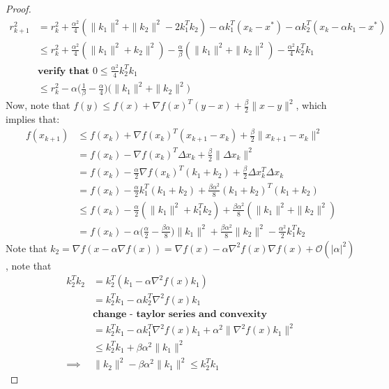 \begin{proof}
\begin{equation}
\begin{aligned}
r_{k+1}^2 &= r_k^2 + \frac{\alpha^2}{4}(\|k_1\|^2 + \|k_2\|^2 - 2k_1^T k_2) - \alpha k_1^T (x_k - x^*) - \alpha k_2^T (x_k - \alpha k_1 - x^*) \\
&\leq r_k^2 + \frac{\alpha^2}{4}(\| k_1\|^2 + k_2 \|^2) - \frac{\alpha}{\beta}(\|k_1\|^2 + \|k_2\|^2) - \frac{\alpha^2}{4}k_2^T k_1 \\
&\textbf{verify that } 0 \leq \frac{\alpha^2}{4}k_2^T k_1  \\
&\leq r_k^2 - \alpha \big(\frac{1}{\beta} - \frac{\alpha}{4}\big) \big( \|k_1\|^2 + \|k_2\|^2 \big)
\end{aligned}
\end{equation}
Now, note that $f(y) \leq f(x) + \nabla f(x)^T(y-x) + \frac{\beta}{2}\|x-y\|^2$, which implies that:
\begin{equation}
\begin{aligned}
f(x_{k+1}) &\leq f(x_k) + \nabla f(x_k)^T (x_{k+1} - x_k) + \frac{\beta}{2}\|x_{k+1} - x_k \|^2 \\
&= f(x_k) - \nabla f(x_k)^T \Delta x_k + \frac{\beta}{2}\| \Delta x_k \|^2 \\
&= f(x_k) - \frac{\alpha}{2}\nabla f(x_k)^T (k_1 + k_2) + \frac{\beta}{2}\Delta x_k^T \Delta x_k \\
&= f(x_k) - \frac{\alpha}{2}k_1^T(k_1 + k_2) + \frac{\beta \alpha^2}{8}(k_1 + k_2)^T(k_1 + k_2) \\
& \leq  f(x_k) - \frac{\alpha}{2}(\|k_1\|^2 + k_1^T k_2) + \frac{\beta \alpha^2}{8}(\|k_1\|^2 + \|k_2\|^2) \\
&= f(x_k) - \alpha \big(\frac{\alpha}{2} - \frac{\beta \alpha}{8}\big)\|k_1\|^2 + \frac{\beta \alpha^2}{8}\|k_2\|^2 - \frac{\alpha^2}{2} k_1^T k_2
\end{aligned}
\end{equation}
Note that $k_2 = \nabla f(x - \alpha \nabla f(x)) = \nabla f(x) - \alpha \nabla^2 f(x) \nabla f(x) + \mathcal{O}(|\alpha|^2)$, note that
\begin{equation}
\begin{aligned}
k_2^T k_2 &= k_2^T(k_1 - \alpha \nabla^2 f(x) k_1) \\
&= k_2^T k_1 - \alpha k_2^T \nabla^2 f(x) k_1 \\
& \textbf{change - taylor series and convexity} \\
&= k_2^T k_1 - \alpha k_1^T \nabla^2 f(x) k_1 + \alpha^2 \|\nabla^2 f(x) k_1\|^2 \\
& \leq k_2^T k_1 + \beta \alpha^2 \|k_1\|^2 \\
\implies & \|k_2\|^2 - \beta \alpha^2 \|k_1\|^2 \leq k_2^T k_1
\end{aligned}
\end{equation}


\end{proof}
